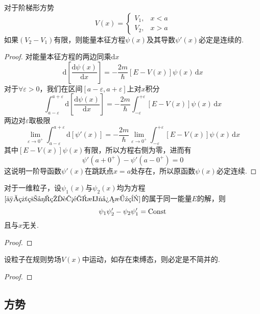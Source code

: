 \begin{theorem}\label{定理5}
    对于阶梯形方势
    $$
        V(x) = \begin{cases}
            V_1, & x<a \\
            V_2, & x>a
        \end{cases}
    $$
    如果$(V_2-V_1)$有限，则能量本征方程$\psi(x)$及其导数$\psi'(x)$必定是连续的.
\end{theorem}
\begin{proof}
    对能量本征方程的两边同乘$\mathrm{d}x$
    $$
        \mathrm{d}\left[\frac{\mathrm{d}\psi(x)}{\mathrm{d}x}\right]
        =-\frac{2m}{\hbar}[E-V(x)]\psi(x)\,\mathrm{d}x
    $$
    对于$\forall\varepsilon>0$，我们在区间$[a-\varepsilon, a+\varepsilon]$上对$x$积分
    $$
        \int_{a-\varepsilon}^{a+\varepsilon}\mathrm{d}\left[\frac{\mathrm{d}\psi(x)}{\mathrm{d}x}\right]
        =-\frac{2m}{\hbar}\int_{-\varepsilon}^{+\varepsilon}[E-V(x)]\psi(x)\,\mathrm{d}x
    $$
    两边对$\varepsilon$取极限
    $$
        \lim_{\varepsilon\to0^+}\int_{a-\varepsilon}^{a+\varepsilon}\mathrm{d}\left[\psi'(x)\right]
        =-\frac{2m}{\hbar}\lim_{\varepsilon\to0^+}\int_{-\varepsilon}^{+\varepsilon}[E-V(x)]\psi(x)\,\mathrm{d}x
    $$
    其中$[E-V(x)]\psi(x)$有限，所以方程右侧为零，进而有
    $$
        \psi'(a+0^+)-\psi'(a-0^+)=0
    $$
    这说明一阶导函数$\psi'(x)$在跳跃点$x=a$处存在，所以原函数$\psi(x)$必定连续.
\end{proof}





\begin{theorem}\label{定理6}
    对于一维粒子，设$\psi_1(x)$与$\psi_2(x)$均为方程$\eqref{一维粒子的能量本征方程}$的属于同一能量$E$的解，则
    $$
        \psi_1\psi_2' - \psi_2\psi_1' = {\rm Const}
    $$
    且与$x$无关.
\end{theorem}
\begin{proof}
\end{proof}






\begin{theorem}\label{定理7}
    设粒子在规则势场$V(x)$中运动，如存在束缚态，则必定是不简并的.
\end{theorem}
\begin{proof}
\end{proof}





\subsection{方势}

